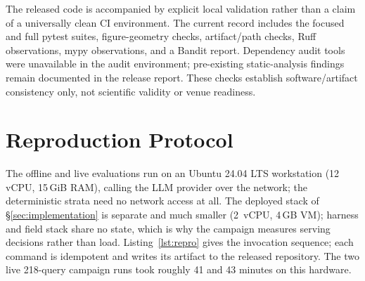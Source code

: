 The released code is accompanied by explicit local validation rather than a
claim of a universally clean CI environment. The current record includes the
focused and full pytest suites, figure-geometry checks, artifact/path checks,
Ruff observations, mypy observations, and a Bandit report. Dependency audit
tools were unavailable in the audit environment; pre-existing static-analysis
findings remain documented in the release report. These checks establish
software/artifact consistency only, not scientific validity or venue readiness.

\section{Reproduction Protocol}
\label{app:repro}
The offline and live evaluations run on an Ubuntu 24.04 LTS workstation
(12 vCPU, 15\,GiB RAM), calling the LLM provider over the network; the
deterministic strata need no network access at all. The deployed stack of
\S\ref{sec:implementation} is separate and much smaller (2~vCPU, 4\,GB
VM); harness and field stack share no state, which is why the campaign
measures serving decisions rather than load. Listing~\ref{lst:repro}
gives the invocation sequence; each command is idempotent and writes its
artifact to the released repository. The two live 218-query campaign runs took roughly 41 and 43
minutes on this hardware.


